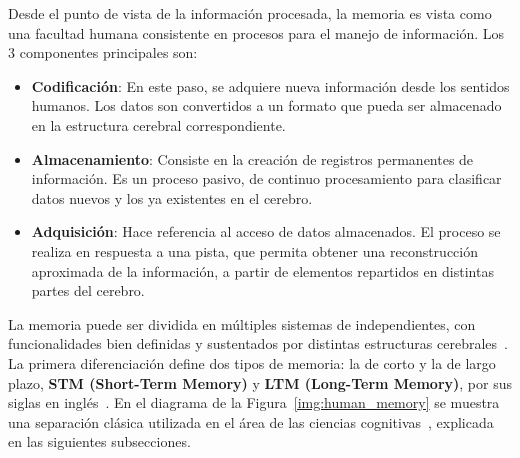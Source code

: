 Desde el punto de vista de la información procesada, la memoria es vista como una facultad humana consistente en procesos para el manejo de información. Los 3 componentes principales son:

\begin{itemize}[topsep=0pt]
	\setlength\itemsep{0.2em}
	\item \textbf{Codificación}: En este paso, se adquiere nueva información desde los sentidos humanos. Los datos son convertidos a un formato que pueda ser almacenado en la estructura cerebral correspondiente.
	\item \textbf{Almacenamiento}: Consiste en la creación de registros permanentes de información. Es un proceso pasivo, de continuo procesamiento para clasificar datos nuevos y los ya existentes en el cerebro.
	\item \textbf{Adquisición}: Hace referencia al acceso de datos almacenados. El proceso se realiza en respuesta a una pista, que permita obtener una reconstrucción aproximada de la información, a partir de elementos repartidos en distintas partes del cerebro.
\end{itemize}

La memoria puede ser dividida en múltiples sistemas de independientes, con funcionalidades bien definidas y sustentados por distintas estructuras cerebrales~\cite{pmid-Squire}. La primera diferenciación define dos tipos de memoria: la de corto y la de largo plazo, \textbf{STM (Short-Term Memory)} y \textbf{LTM (Long-Term Memory)}, por sus siglas en inglés~\cite{pmid10643472}. En el diagrama de la Figura~\ref{img:human_memory} se muestra una separación clásica utilizada en el área de las ciencias cognitivas~\cite{Eichenbaum:2008}, explicada en las siguientes subsecciones.

\usetikzlibrary{arrows,shapes,positioning,shadows,trees}


